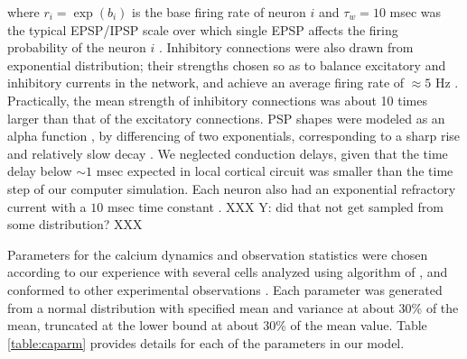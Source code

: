 \noindent where $r_i=\exp(b_i)$ is the base firing rate of neuron $i$ and $\tau_w=10$ msec was the typical EPSP/IPSP scale over which single EPSP affects the firing probability of the neuron $i$ \cite{}. Inhibitory connections were also drawn from exponential distribution; their strengths chosen so as to balance excitatory and inhibitory currents in the network, and achieve an average firing rate of  $\approx 5 $ Hz \cite{Abeles01}. Practically, the mean strength of inhibitory connections was about 10 times larger than that of the excitatory connections. PSP shapes were modeled as an alpha function \cite{Koch99}, by differencing of two exponentials, corresponding to a sharp rise and relatively slow decay \cite{Sayer1990}.
We neglected conduction delays, given that the time delay below $\sim 1$ msec expected in local cortical circuit was smaller than the time step of our computer simulation.  Each neuron also had an exponential refractory current with a $10$ msec time constant \cite{Koch99}. XXX Y: did that not get sampled from some distribution? XXX

Parameters for the calcium dynamics and observation statistics were chosen according to our experience with several cells analyzed using algorithm of \cite{Vogelstein2009}, and conformed to other experimental observations \cite{ImagingManual,HelmchenSakmann96,BrenowitzRegehr07}. Each parameter was generated from a normal distribution with specified mean and variance at about 30\% of the mean, truncated at the lower bound at about 30\% of the mean value.  Table \ref{table:caparm} provides details for each of the parameters in our model.

